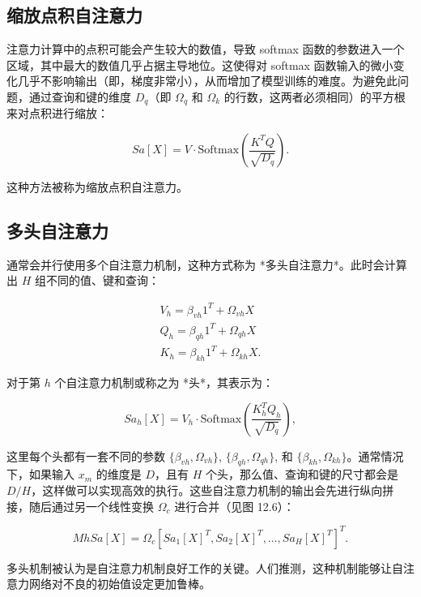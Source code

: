 \subsection{缩放点积自注意力}
注意力计算中的点积可能会产生较大的数值，导致 softmax 函数的参数进入一个区域，其中最大的数值几乎占据主导地位。这使得对 softmax 函数输入的微小变化几乎不影响输出（即，梯度非常小），从而增加了模型训练的难度。为避免此问题，通过查询和键的维度 \(D_q\)（即 \(\Omega_q\) 和 \(\Omega_k\) 的行数，这两者必须相同）的平方根来对点积进行缩放：

\begin{equation}
Sa[X] = V \cdot \text{Softmax} \left( \frac{K^T Q}{\sqrt{D_q}} \right). 
\end{equation}

这种方法被称为缩放点积自注意力。

\subsection{多头自注意力}
通常会并行使用多个自注意力机制，这种方式称为 *多头自注意力*。此时会计算出 \(H\) 组不同的值、键和查询：


\begin{align}
V_h = \beta_{vh}1^T + \Omega_{vh}X \\
Q_h = \beta_{qh}1^T + \Omega_{qh}X \\
K_h = \beta_{kh}1^T + \Omega_{kh}X. 
\end{align} 


对于第 \(h\) 个自注意力机制或称之为 *头*，其表示为：

\begin{equation}
Sa_h[X] = V_h \cdot \text{Softmax} \left( \frac{K_h^T Q_h}{\sqrt{D_q}} \right), 
\end{equation}

这里每个头都有一套不同的参数 \(\{\beta_{vh},\Omega_{vh}\}\), \(\{\beta_{qh},\Omega_{qh}\}\), 和 \(\{\beta_{kh},\Omega_{kh}\}\)。通常情况下，如果输入 \(x_m\) 的维度是 \(D\)，且有 \(H\) 个头，那么值、查询和键的尺寸都会是 \(D/H\)，这样做可以实现高效的执行。这些自注意力机制的输出会先进行纵向拼接，随后通过另一个线性变换 \(\Omega_c\) 进行合并（见图 12.6）：

\begin{equation}
MhSa[X] = \Omega_c \left[ Sa_1[X]^T, Sa_2[X]^T, \ldots, Sa_H[X]^T \right]^T . 
\end{equation}

多头机制被认为是自注意力机制良好工作的关键。人们推测，这种机制能够让自注意力网络对不良的初始值设定更加鲁棒。


